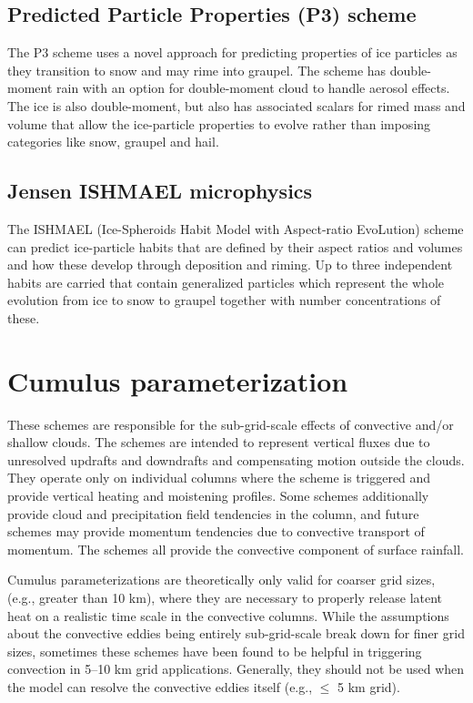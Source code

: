 \subsection {Predicted Particle Properties (P3) scheme}
The P3 scheme \citep{morrison15} uses a novel approach for predicting properties of ice particles as they transition to
snow and may rime into graupel. The scheme has double-moment rain with an option for double-moment cloud to
handle aerosol effects. The ice is also double-moment, but also has associated scalars for rimed mass and volume that
allow the ice-particle properties to evolve rather than imposing categories like snow, graupel and hail.

\subsection {Jensen ISHMAEL microphysics}
The ISHMAEL (Ice-Spheroids Habit Model with Aspect-ratio EvoLution) scheme \citep{jensen17} can predict ice-particle habits
that are defined by their aspect ratios and volumes and how these develop through deposition and riming. Up to three independent
habits are carried that contain generalized particles which represent the whole evolution from ice to snow to graupel together with
number concentrations of these.

\section{Cumulus parameterization}

These schemes are responsible for the sub-grid-scale effects of 
convective and/or shallow clouds. The schemes are intended to 
represent vertical fluxes due to unresolved updrafts and 
downdrafts and compensating motion outside the clouds. They 
operate only on individual columns where the scheme is triggered and 
provide vertical heating and moistening profiles. Some schemes 
additionally provide cloud and precipitation field tendencies 
in the column, and future schemes may provide momentum tendencies 
due to convective transport of momentum. The schemes all provide 
the convective component of surface rainfall.

Cumulus parameterizations are theoretically only valid for coarser grid sizes,
(e.g., greater than 10 km), where they are necessary to properly
release latent heat on a realistic time scale in the convective columns.
While the assumptions about the convective eddies being entirely
sub-grid-scale break down for finer grid sizes, sometimes these
schemes have been found to be helpful in triggering convection in
5--10 km grid applications. Generally, they should not be used when
the model can resolve the convective eddies itself (e.g., $\le$ 5 km grid).

